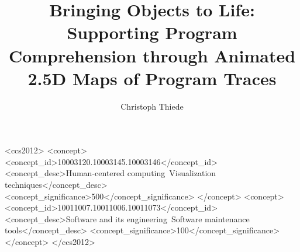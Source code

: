 \documentclass[sigconf,natbib=false,nonacm,screen]{acmart}
\begin{document}
\title{Bringing Objects to Life: Supporting Program Comprehension through Animated 2.5D Maps of Program Traces}

\author{Christoph Thiede}




\begin{CCSXML}
<ccs2012>
	<concept>
		<concept_id>10003120.10003145.10003146</concept_id>
		<concept_desc>Human-centered computing~Visualization techniques</concept_desc>
		<concept_significance>500</concept_significance>
	</concept>
	<concept>
		<concept_id>10011007.10011006.10011073</concept_id>
		<concept_desc>Software and its engineering~Software maintenance tools</concept_desc>
		<concept_significance>100</concept_significance>
	</concept>
</ccs2012>
\end{CCSXML}


\end{document}
